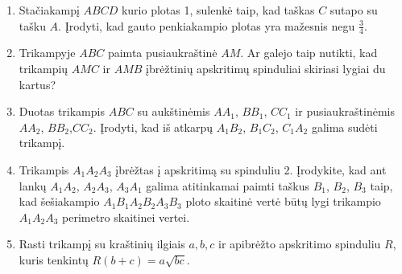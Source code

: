 \begin{enumerate}
\item Stačiakampį $ABCD$ kurio plotas 1, sulenkė taip, kad
  taškas $C$ sutapo su tašku $A$. Įrodyti, kad gauto
  penkiakampio plotas yra mažesnis negu $\frac{3}{4}$.

\item Trikampyje $ABC$ paimta pusiaukraštinė $AM$. Ar galejo
  taip nutikti, kad trikampių $AMC$ ir $AMB$ įbrėžtinių
  apskritimų spinduliai skiriasi lygiai du kartus?

\item Duotas trikampis $ABC$ su aukštinėmis $AA_1$, $BB_1$,
  $CC_1$ ir pusiaukraštinėmis $AA_2$, $BB_2$,$CC_2$.
  Įrodyti, kad iš atkarpų $A_1B_2$, $B_1C_2$, $C_1A_2$
  galima sudėti trikampį.
\item Trikampis $A_1A_2A_3$ įbrėžtas į apskritimą su
  spinduliu 2. Įrodykite, kad ant lankų $A_1A_2$, $A_2A_3$,
  $A_3A_1$ galima atitinkamai paimti taškus $B_1$, $B_2$,
  $B_3$ taip, kad šešiakampio $A_1B_1A_2B_2A_3B_3$ ploto
  skaitinė vertė būtų lygi trikampio $A_1A_2A_3$ perimetro
  skaitinei vertei.
\item Rasti trikampį su kraštinių ilgiais $a, b, c$ ir
  apibrėžto apskritimo spinduliu $R$, kuris tenkintų $R(b+c)
  = a\sqrt{bc}$.
  

\end{enumerate}
